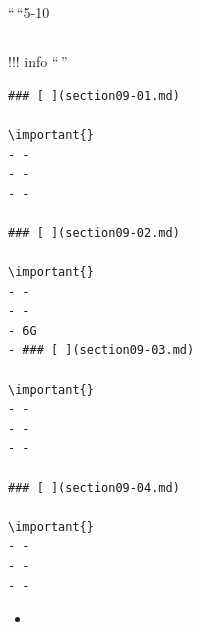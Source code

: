 \hypertarget{section}{%
\section{}\label{section}}


\hypertarget{section-1}{%
\subsection{}\label{section-1}}

``\,``5-10

\hypertarget{section-2}{%
\subsection{}\label{section-2}}

!!! info ``\,''

\begin{verbatim}
### [ ](section09-01.md)

\important{}
- - 
- - 
- - 

### [ ](section09-02.md) 

\important{}
- - 
- - 
- 6G
- ### [ ](section09-03.md)

\important{}
- - 
- - 
- - 

### [ ](section09-04.md)

\important{}
- - 
- - 
- - 
\end{verbatim}

\begin{itemize}
\item
  \important{}
\end{itemize}

\important{}

